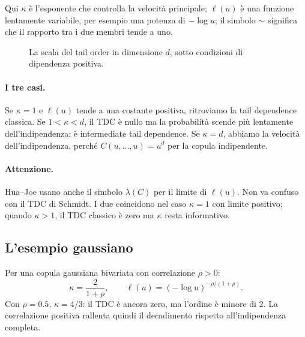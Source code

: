 \documentclass[11pt,a4paper]{article}
\newcommand{\Attenzione}{\paragraph{Attenzione.}}
\begin{document}
Qui $\kappa$ è l'esponente che controlla la velocità principale;
$\ell(u)$ è una funzione lentamente variabile, per esempio una potenza di
$-\log u$; il simbolo $\sim$ significa che il rapporto tra i due membri tende
a uno.

\begin{figure}[ht]
\centering
{}
\caption{La scala del tail order in dimensione $d$, sotto condizioni di dipendenza positiva.}
\label{fig:kappa-scale}
\end{figure}

\paragraph{I tre casi.}
Se $\kappa=1$ e $\ell(u)$ tende a una costante positiva, ritroviamo la tail
dependence classica. Se $1<\kappa<d$, il TDC è nullo ma la probabilità scende
più lentamente dell'indipendenza: è intermediate tail dependence. Se
$\kappa=d$, abbiamo la velocità dell'indipendenza, perché
$C(u,\ldots,u)=u^d$ per la copula indipendente.

\Attenzione Hua--Joe usano anche il simbolo $\lambda(C)$ per il limite di
$\ell(u)$. Non va confuso con il TDC di Schmidt. I due coincidono nel caso
$\kappa=1$ con limite positivo; quando $\kappa>1$, il TDC classico è zero ma
$\kappa$ resta informativo.

\subsection{L'esempio gaussiano}

Per una copula gaussiana bivariata con correlazione $\rho>0$:
\begin{equation}
 \kappa=\frac{2}{1+\rho},
 \qquad
 \ell(u)=(-\log u)^{-\rho/(1+\rho)}.
 \label{eq:gaussian-order}
\end{equation}
Con $\rho=0.5$, $\kappa=4/3$: il TDC è ancora zero, ma l'ordine è minore di
$2$. La correlazione positiva rallenta quindi il decadimento rispetto
all'indipendenza completa.
\end{document}
